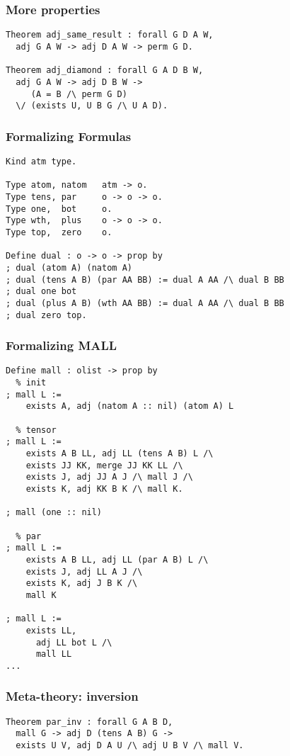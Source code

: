 \documentclass{beamer}
\begin{document}
\begin{frame}[fragile]
  \frametitle{More properties}

\begin{lstlisting}
Theorem adj_same_result : forall G D A W,
  adj G A W -> adj D A W -> perm G D.

Theorem adj_diamond : forall G A D B W,
  adj G A W -> adj D B W ->
     (A = B /\ perm G D)
  \/ (exists U, U B G /\ U A D).
\end{lstlisting}
\end{frame}

\begin{frame}[fragile]
  \frametitle{Formalizing Formulas}

\begin{lstlisting}
Kind atm type.

Type atom, natom   atm -> o.
Type tens, par     o -> o -> o.
Type one,  bot     o.
Type wth,  plus    o -> o -> o.
Type top,  zero    o.

Define dual : o -> o -> prop by
; dual (atom A) (natom A)
; dual (tens A B) (par AA BB) := dual A AA /\ dual B BB
; dual one bot
; dual (plus A B) (wth AA BB) := dual A AA /\ dual B BB
; dual zero top.
\end{lstlisting}
\end{frame}

\begin{frame}[fragile]
  \frametitle{Formalizing MALL}

  \mbox{} \bigskip

\begin{lstlisting}
Define mall : olist -> prop by
  % init
; mall L :=
    exists A, adj (natom A :: nil) (atom A) L

  % tensor
; mall L :=
    exists A B LL, adj LL (tens A B) L /\
    exists JJ KK, merge JJ KK LL /\
    exists J, adj JJ A J /\ mall J /\
    exists K, adj KK B K /\ mall K.

; mall (one :: nil)

  % par
; mall L :=
    exists A B LL, adj LL (par A B) L /\
    exists J, adj LL A J /\
    exists K, adj J B K /\
    mall K

; mall L :=
    exists LL,
      adj LL bot L /\
      mall LL
...
\end{lstlisting}
\end{frame}

\begin{frame}[fragile]
  \frametitle{Meta-theory: inversion}


\begin{lstlisting}
Theorem par_inv : forall G A B D,
  mall G -> adj D (tens A B) G ->
  exists U V, adj D A U /\ adj U B V /\ mall V.
\end{lstlisting}
\end{frame}
\end{document}
